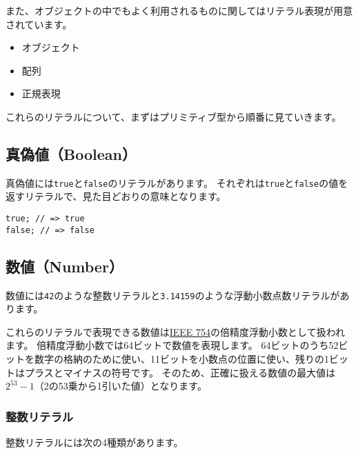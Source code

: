 また、オブジェクトの中でもよく利用されるものに関してはリテラル表現が用意されています。

\begin{itemize}
\item
  オブジェクト
\item
  配列
\item
  正規表現
\end{itemize}

これらのリテラルについて、まずはプリミティブ型から順番に見ていきます。
\vspace{-2mm}
\hypertarget{boolean}{%
\subsection{真偽値（Boolean）}\label{boolean}}

真偽値には\texttt{true}と\texttt{false}のリテラルがあります。
それぞれは\texttt{true}と\texttt{false}の値を返すリテラルで、見た目どおりの意味となります。

\begin{lstlisting}
true; // => true
false; // => false
\end{lstlisting}
\vspace{-2mm}
\hypertarget{number}{%
\subsection{数値（Number）}\label{number}}

数値には\texttt{42}のような整数リテラルと\texttt{3.14159}のような浮動小数点数リテラルがあります。

これらのリテラルで表現できる数値は\href{https://ja.wikipedia.org/wiki/IEEE_754}{IEEE 754}の倍精度浮動小数として扱われます。
倍精度浮動小数では64ビットで数値を表現します。
64ビットのうち52ビットを数字の格納のために使い、11ビットを小数点の位置に使い、残りの1ビットはプラスとマイナスの符号です。
そのため、正確に扱える数値の最大値は$2^{53}-1$（2の53乗から1引いた値）となります。

\hypertarget{integer-literal}{%
\subsubsection{整数リテラル}\label{integer-literal}}

整数リテラルには次の4種類があります。

